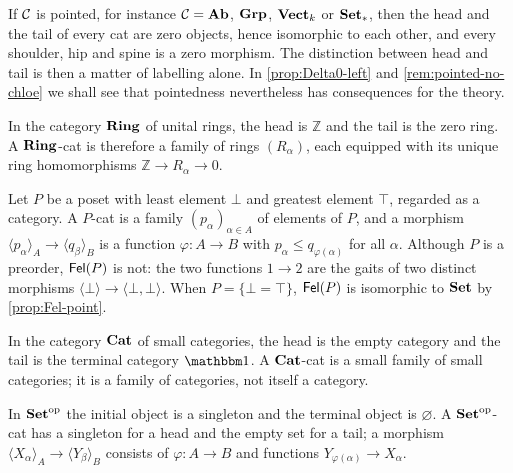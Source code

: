 \begin{example}\label{ex:pointed-cats}
If $\mathcal{C}$ is pointed, for instance $\mathcal{C}=\mathbf{Ab}$, $\mathbf{Grp}$, $\mathbf{Vect}_k$ or $\mathbf{Set}_{*}$,
then the head and the tail of every cat are zero objects, hence isomorphic to
each other, and every shoulder, hip and spine is a zero morphism. The
distinction between head and tail is then a matter of labelling alone. In
\cref{prop:Delta0-left} and \cref{rem:pointed-no-chloe} we shall see that
pointedness nevertheless has consequences for the theory.
\end{example}

\begin{example}[Rings]\label{ex:ring-cats}
In the category $\mathbf{Ring}$ of unital rings, the head is $\mathbb Z$ and the tail
is the zero ring. A $\mathbf{Ring}$-cat is therefore a family of rings
$(R_\alpha)$, each equipped with its unique ring homomorphisms
$\mathbb Z\to R_\alpha\to 0$.
\end{example}

\begin{example}\label{ex:poset-cats}
Let $P$ be a poset with least element $\bot$ and greatest element $\top$,
regarded as a category. A $P$-cat is a family $(p_\alpha)_{\alpha\in A}$ of
elements of $P$, and a morphism $\langle p_\alpha\rangle_A\to\langle q_\beta\rangle_B$
is a function $\varphi\colon A\to B$ with $p_\alpha\le q_{\varphi(\alpha)}$ for
all $\alpha$. Although $P$ is a preorder, $\mathsf{Fel}(P)$ is not: the two functions
$1\to2$ are the gaits of two distinct morphisms $\langle\bot\rangle\to\langle\bot,\bot\rangle$.
When $P=\{\bot=\top\}$, $\mathsf{Fel}(P)$ is isomorphic to $\mathbf{Set}$ by \cref{prop:Fel-point}.
\end{example}

\begin{example}[Categories]\label{ex:cat-cats}
In the category $\mathbf{Cat}$ of small categories, the head is the empty category and
the tail is the terminal category $\one$. A $\mathbf{Cat}$-cat is a small family of
small categories; it is a family of categories, not itself a category.
\end{example}

\begin{example}\label{ex:setop-cats}
In $\mathbf{Set}^{\mathrm{op}}$ the initial object is a singleton and the terminal object is
$\varnothing$. A $\mathbf{Set}^{\mathrm{op}}$-cat has a singleton for a head and the empty set
for a tail; a morphism $\langle X_\alpha\rangle_A\to\langle Y_\beta\rangle_B$
consists of $\varphi\colon A\to B$ and functions $Y_{\varphi(\alpha)}\to X_\alpha$.
\end{example}

